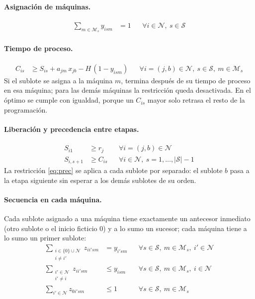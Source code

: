 \documentclass[11pt,a4paper]{article}
\newcommand{\Sg}{\mathcal{S}}
\newcommand{\N}{\mathcal{N}}
\newcommand{\M}{\mathcal{M}}
\begin{document}
\paragraph{Asignación de máquinas.}
\begin{align}
  \sum_{m\in\M_s} y_{ism} &= 1
    && \forall i\in\N,\ s\in\Sg \label{eq:asig}
\end{align}

\paragraph{Tiempo de proceso.}
\begin{align}
  C_{is} &\ge S_{is} + a_{jm}\, x_{jb} - H\,(1 - y_{ism})
    && \forall i=(j,b)\in\N,\ s\in\Sg,\ m\in\M_s \label{eq:fin}
\end{align}
Si el sublote se asigna a la máquina $m$, termina después de su tiempo de
proceso en esa máquina; para las demás máquinas la restricción queda
desactivada. En el óptimo se cumple con igualdad, porque un $C_{is}$ mayor solo
retrasa el resto de la programación.

\paragraph{Liberación y precedencia entre etapas.}
\begin{align}
  S_{i1} &\ge r_j
    && \forall i=(j,b)\in\N \label{eq:rel}\\
  S_{i,s+1} &\ge C_{is}
    && \forall i\in\N,\ s=1,\dots,|\Sg|-1 \label{eq:prec}
\end{align}
La restricción \eqref{eq:prec} se aplica a cada sublote por separado: el
sublote $b$ pasa a la etapa siguiente sin esperar a los demás sublotes de su
orden.

\paragraph{Secuencia en cada máquina.}
Cada sublote asignado a una máquina tiene exactamente un antecesor inmediato
(otro sublote o el inicio ficticio $0$) y a lo sumo un sucesor; cada máquina
tiene a lo sumo un primer sublote:
\begin{align}
  \sum_{\substack{i\in\{0\}\cup\N\\ i\neq i'}} z_{ii'sm} &= y_{i'sm}
    && \forall s\in\Sg,\ m\in\M_s,\ i'\in\N \label{eq:ant}\\
  \sum_{\substack{i'\in\N\\ i'\neq i}} z_{ii'sm} &\le y_{ism}
    && \forall s\in\Sg,\ m\in\M_s,\ i\in\N \label{eq:suc}\\
  \sum_{i'\in\N} z_{0i'sm} &\le 1
    && \forall s\in\Sg,\ m\in\M_s \label{eq:primero}
\end{align}
\end{document}
